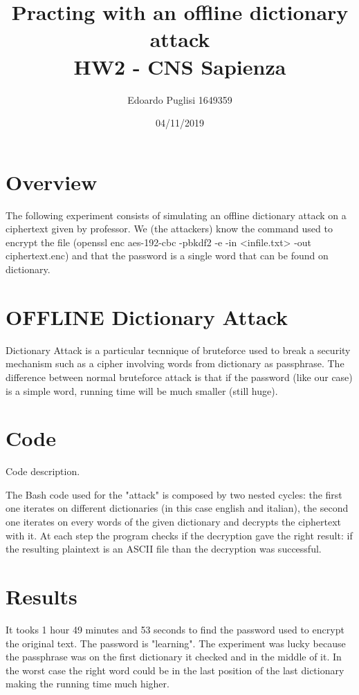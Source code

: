\documentclass[11pt,a4paper]{article}
\title{Practing with an offline dictionary attack \\ HW2 - CNS Sapienza}
\author{Edoardo Puglisi 1649359}
\date{04/11/2019}
\begin{document}
\lstset{breaklines=true}
	
\maketitle
\tableofcontents
\clearpage

\section{Overview}
The following experiment consists of simulating an offline dictionary attack on a ciphertext given by professor. We (the attackers) know the command used to encrypt the file (openssl enc aes-192-cbc -pbkdf2 -e -in <infile.txt> -out ciphertext.enc) and that the password is a single word that can be found on dictionary.

\section{OFFLINE Dictionary Attack}
Dictionary Attack is a particular tecnnique of bruteforce used to break a security mechanism such as a cipher involving words from dictionary as passphrase.
The difference between normal bruteforce attack is that if the password (like our case) is a simple word, running time will be much smaller (still huge).


\section{Code}
Code description.

The Bash code used for the "attack" is composed by two nested cycles: the first one iterates on different dictionaries (in this case english and italian), the second one iterates on every words of the given dictionary and decrypts the ciphertext with it. At each step the program checks if the decryption gave the right result: if the resulting plaintext is an ASCII file than the decryption was successful.

\section{Results}
It tooks 1 hour 49 minutes and 53 seconds to find the password used to encrypt the original text. The password is "learning".
The experiment was lucky because the passphrase was on the first dictionary it checked and in the middle of it. In the worst case the right word could be in the last position of the last dictionary making the running time much higher.
\end{document}
